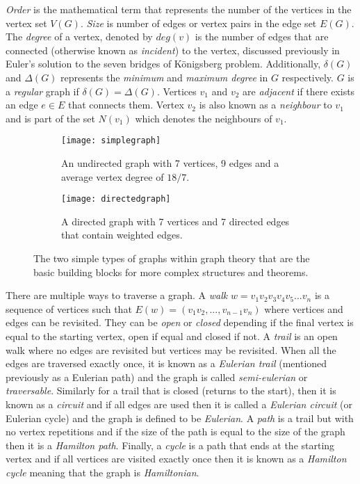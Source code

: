 \emph{Order} is the mathematical term that represents the number of the vertices in the vertex set $V(G)$. \emph{Size} is number of edges or vertex pairs in the edge set $E(G)$. The \emph{degree} of a vertex, denoted by $deg(v)$ is the number of edges that are connected (otherwise known as \emph{incident}) to the vertex, discussed previously in Euler's solution to the seven bridges of Königsberg problem. Additionally, $\delta(G)$ and $\Delta(G)$ represents the \emph{minimum} and \emph{maximum degree} in $G$ respectively. $G$ is a \emph{regular} graph if $\delta(G) = \Delta(G)$. Vertices $v_{1}$ and $v_{2}$ are \emph{adjacent} if there exists an edge $e \in E$ that connects them. Vertex $v_{2}$ is also known as a \emph{neighbour} to $v_{1}$ and is part of the set $N(v_{1})$ which denotes the neighbours of $v_{1}$. 
\newline

\begin{figure}[!htb]
\centering
\begin{subfigure}{.45\textwidth}
	\texttt{[image: simplegraph]}
	\caption{An undirected graph with 7 vertices, 9 edges and a average vertex degree of $18/7$.}
	\label{fig:Simple Graph}
\end{subfigure}
\hfill
\begin{subfigure}{.45\textwidth}
	\texttt{[image: directedgraph]}
	\caption{A directed graph with 7 vertices and 7 directed edges that contain weighted edges.}
	\label{fig:Directed Graph}
\end{subfigure}
\caption{The two simple types of graphs within graph theory that are the basic building blocks for more complex structures and theorems.}
\end{figure}

There are multiple ways to traverse a graph. A \emph{walk} $w = v_1v_2v_3v_4v_5...v_n$ is a sequence of vertices such that $E(w) = (v_1v_2,...,v_{n-1}v_n)$ where vertices and edges can be revisited. They can be \emph{open} or \emph{closed} depending if the final vertex is equal to the starting vertex, open if equal and closed if not. A \emph{trail} is an open walk where no edges are revisited but vertices may be revisited. When all the edges are traversed exactly once, it is known as a \emph{Eulerian trail} (mentioned previously as a Eulerian path) and the graph is called \emph{semi-eulerian} or \emph{traversable}. Similarly for a trail that is closed (returns to the start), then it is known as a \emph{circuit} and if all edges are used then it is called a \emph{Eulerian circuit} (or Eulerian cycle) and the graph is defined to be \emph{Eulerian}. A \emph{path} is a trail but with no vertex repetitions and if the size of the path is equal to the size of the graph then it is a \emph{Hamilton path}. Finally, a \emph{cycle} is a path that ends at the starting vertex and if all vertices are visited exactly once then it is known as a \emph{Hamilton cycle} meaning that the graph is \emph{Hamiltonian}.
\newline

